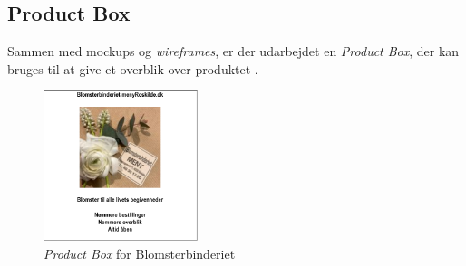 \subsection{Product Box}
Sammen med mockups og \emph{wireframes}, er der udarbejdet en \emph{Product Box}, der kan bruges til at give et overblik over produktet .
\begin{figure}[H]
    \centering
    \includegraphics[width=0.4\textwidth]{figures/business/product-box.png}
    \caption{\emph{Product Box} for Blomsterbinderiet}
    \label{fig:product-box}
\end{figure}

